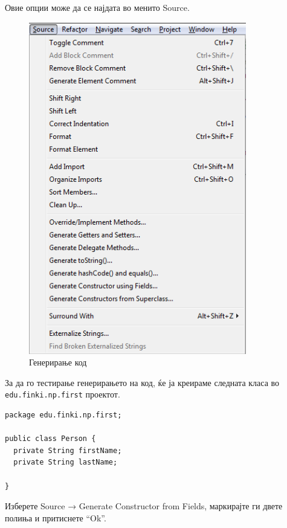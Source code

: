 Овие опции може да се најдата во менито Source.

\begin{figure}
\centering
\includegraphics[scale=.5]{images/source}
\caption{Генерирање код}
\end{figure}

За да го тестирање генерирањето на код, ќе ја креираме следната класа во
\texttt{edu.finki.np.first} проектот.

\begin{lstlisting}
package edu.finki.np.first;

public class Person {
  private String firstName;
  private String lastName;

} 
\end{lstlisting}

Изберете Source → Generate Constructor from Fields, маркирајте ги двете
полиња и притиснете ``Ok''.


